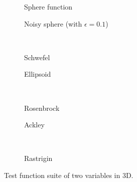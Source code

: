\begin{figure}\centering
	\begin{subfigure}{0.37\textwidth}
		\centering{}
		\caption{Sphere function}\label{fig:fun:sphere}
	\end{subfigure}
	\quad
	\begin{subfigure}{0.37\textwidth}
		\centering{}
		\caption{Noisy sphere (with $\epsilon=0.1$)}\label{fig:fun:nsphere}
	\end{subfigure}
	\\
	\begin{subfigure}{0.37\textwidth}
		\centering{}
		\caption{Schwefel}\label{fig:fun:schwefel}
	\end{subfigure}
	\quad
	\begin{subfigure}{0.37\textwidth}
		\centering{}
		\caption{Ellipsoid}\label{fig:fun:ellipsoid}
	\end{subfigure}
	\\
	\begin{subfigure}{0.37\textwidth}
		\centering{}
		\caption{Rosenbrock}\label{fig:fun:rosen}
	\end{subfigure}
	\quad
	\begin{subfigure}{0.37\textwidth}
		\centering{}
		\caption{Ackley}\label{fig:fun:ackley}
	\end{subfigure}
	\\
	\begin{subfigure}{0.37\textwidth}
		\centering{}
		\caption{Rastrigin}\label{fig:fun:rastrigin}
	\end{subfigure}
	\caption{Test function suite of two variables in 3D.}
\end{figure}





